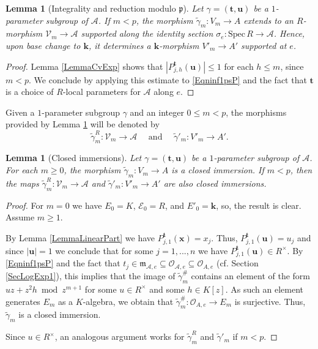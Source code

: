 \documentclass[11pt]{amsart}
\newtheorem{lemma}[theorem]{Lemma}
\theoremstyle{remark}
\numberwithin{equation}{section}
\newcommand{\pfrak}{\mathfrak{p}}
\newcommand{\mfrak}{\mathfrak{m}}
\newcommand{\Acal}{\mathscr{A}}
\newcommand{\Ecal}{\mathscr{E}}
\newcommand{\Ocal}{\mathscr{O}}
\newcommand{\Vcal}{\mathscr{V}}
\newcommand{\kk}{\mathbf{k}}
\newcommand{\xx}{\mathbf{x}}
\newcommand{\ttt}{\mathbf{t}}
\newcommand{\uu}{\mathbf{u}}
\newcommand{\Spec}{\mathrm{Spec}\,}
\begin{document}
\begin{lemma}[Integrality and reduction modulo $\pfrak$]\label{LemmaTruncate1ps} Let $\gamma=(\ttt,\uu)$ be a $1$-parameter subgroup of $\Acal$. If $m<p$, the morphism $\tilde{\gamma}_m:V_m\to A$ extends to an $R$-morphism $\Vcal_m\to \Acal$ supported along the identity section $\sigma_e:\Spec R\to \Acal$. Hence, upon base change to $\kk$, it determines a $\kk$-morphism $V'_m\to A'$ supported at $e$. 
\end{lemma}
\begin{proof} Lemma \ref{LemmaCvExp} shows that $|P^\ttt_{j,h}(\uu)|\le 1$ for each $h\le m$, since $m<p$. We conclude by applying this estimate to \eqref{Eqninf1psP} and the fact that $\ttt$ is a choice of $R$-local parameters for $\Acal$ along $e$.
\end{proof}
Given a $1$-parameter subgroup $\gamma$ and an integer $0\le m<p$, the morphisms provided by Lemma \ref{LemmaTruncate1ps} will be denoted by
$$
\tilde{\gamma}^R_m:\Vcal_m\to \Acal\quad \mbox{ and }\quad \tilde{\gamma}'_m : V'_m\to A'.
$$
\begin{lemma}[Closed immersions]\label{LemmaClosedImm} Let $\gamma=(\ttt,\uu)$ be a $1$-parameter subgroup of $\Acal$. For each $m\ge 0$, the morphism $\tilde{\gamma}_m:V_m\to A$ is a closed immersion. If $m<p$, then the maps $\tilde{\gamma}^R_m:\Vcal_m\to \Acal$ and $\tilde{\gamma}'_m:V'_m\to A'$ are also closed immersions.
\end{lemma}
\begin{proof} For $m=0$ we have $E_0=K$, $\Ecal_0=R$, and $E'_0=\kk$, so, the result is clear. Assume $m\ge 1$.

By Lemma \ref{LemmaLinearPart} we have $P^\ttt_{j,1}(\xx)=x_j$. Thus, $P^\ttt_{j,1}(\uu)=u_j$ and since $|\uu|=1$ we conclude that for some $j=1,...,n$ we have $P^\ttt_{j,1}(\uu)\in R^\times$. By \eqref{Eqninf1psP} and the fact that $t_j\in \mfrak_{\Acal,e}\subseteq \Ocal_{\Acal,e}\subseteq \Ocal_{A,e}$ (cf. Section \ref{SecLogExp1}), this implies that the image of $\tilde{\gamma}_m^\#$ contains an element of the form $uz+z^2h\bmod z^{m+1}$ for some $u\in R^\times$ and some $h\in K[z]$. As such an element generates $E_m$ as a $K$-algebra, we obtain that $\tilde{\gamma}_m^\#:\Ocal_{A,e}\to E_m$ is surjective. Thus, $\tilde{\gamma}_m$ is a closed immersion. 

Since $u\in R^\times$, an analogous argument works for $\tilde{\gamma}^R_m$ and $\tilde{\gamma}'_m$ if $m<p$.
\end{proof}
\end{document}
